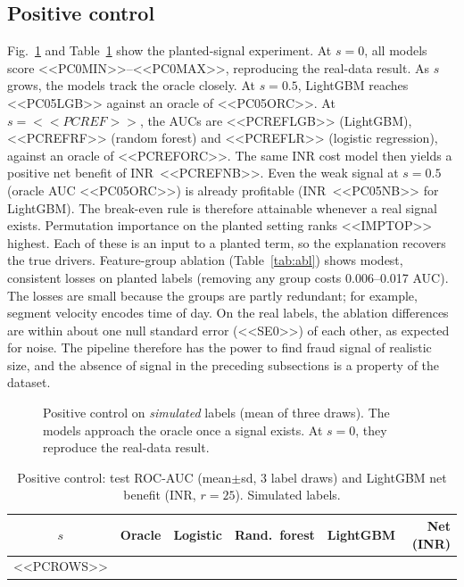 \documentclass[conference]{IEEEtran}
\newcommand{\inr}{INR~}
\begin{document}
\subsection{Positive control}\label{sec:pc}
Fig.~\ref{fig:pc} and Table~\ref{tab:pc} show the planted-signal experiment. At $s=0$, all models score <<PC0MIN>>--<<PC0MAX>>, reproducing the real-data result. As $s$ grows, the models track the oracle closely. At $s=0.5$, LightGBM reaches <<PC05LGB>> against an oracle of <<PC05ORC>>. At $s=<<PCREF>>$, the AUCs are <<PCREFLGB>> (LightGBM), <<PCREFRF>> (random forest) and <<PCREFLR>> (logistic regression), against an oracle of <<PCREFORC>>. The same INR cost model then yields a positive net benefit of \inr<<PCREFNB>>. Even the weak signal at $s=0.5$ (oracle AUC <<PC05ORC>>) is already profitable (\inr<<PC05NB>> for LightGBM). The break-even rule is therefore attainable whenever a real signal exists. Permutation importance on the planted setting ranks <<IMPTOP>> highest. Each of these is an input to a planted term, so the explanation recovers the true drivers. Feature-group ablation (Table~\ref{tab:abl}) shows modest, consistent losses on planted labels (removing any group costs 0.006--0.017 AUC). The losses are small because the groups are partly redundant; for example, segment velocity encodes time of day. On the real labels, the ablation differences are within about one null standard error (<<SE0>>) of each other, as expected for noise. The pipeline therefore has the power to find fraud signal of realistic size, and the absence of signal in the preceding subsections is a property of the dataset.

\begin{figure}[t]
\centering
{}
\caption{Positive control on \emph{simulated} labels (mean of three draws). The models approach the oracle once a signal exists. At $s=0$, they reproduce the real-data result.}\label{fig:pc}
\end{figure}

\begin{table}[t]
\centering
\caption{Positive control: test ROC-AUC (mean$\pm$sd, 3 label draws) and LightGBM net benefit (INR, $r=25$). Simulated labels.}\label{tab:pc}
\footnotesize
\setlength{\tabcolsep}{2.5pt}
\begin{tabular}{@{}cccccr@{}}
\toprule
$s$ & Oracle & Logistic & Rand.\ forest & LightGBM & Net (INR) \\
\midrule
<<PCROWS>>
\bottomrule
\end{tabular}
\end{table}
\end{document}
